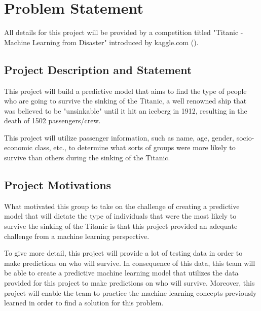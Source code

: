 \documentclass{APA}
\begin{document}
\tableofcontents

\newpage

\section{Problem Statement}
All details for this project will be provided by a competition titled "Titanic - Machine Learning from Disaster" introduced by kaggle.com (\cite{titanic}).





\subsection{Project Description and Statement}

This project will build a predictive model that aims to find the type of people who are going to survive the sinking of the Titanic, a well renowned ship that was believed to be "unsinkable" until it hit an iceberg in 1912, resulting in the death of 1502 passengers/crew.

This project will utilize passenger information, such as name, age, gender, socio-economic class, etc., to determine what sorts of groups were more likely to survive than others during the sinking of the Titanic.

\subsection{Project Motivations}

What motivated this group to take on the challenge of creating a predictive model that will dictate the type of individuals that were the most likely to survive the sinking of the Titanic is that this project provided an adequate challenge from a machine learning perspective.

To give more detail, this project will provide a lot of testing data in order to make predictions on who will survive. In consequence of this data, this team will be able to create a predictive machine learning model that utilizes the data provided for this project to make predictions on who will survive. Moreover, this project will enable the team to practice the machine learning concepts previously learned in order to find a solution for this problem.
\end{document}
